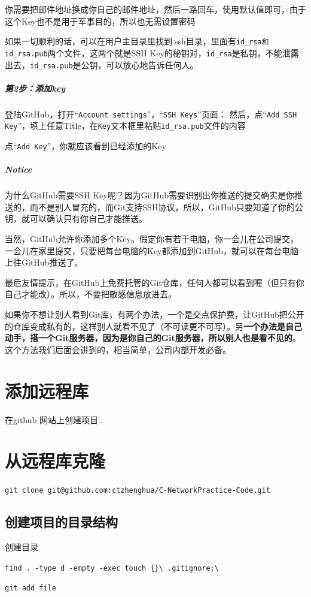 \documentclass[UTF8,a4paper,12pt]{ctexbook}
\begin{document}
		  你需要把邮件地址换成你自己的邮件地址，然后一路回车，使用默认值即可，由于这个Key也不是用于军事目的，所以也无需设置密码
		  
		  如果一切顺利的话，可以在用户主目录里找到.ssh目录，里面有\verb|id_rsa和id_rsa.pub|两个文件，这两个就是SSH Key的秘钥对，\verb|id_rsa|是私钥，不能泄露出去，\verb|id_rsa.pub|是公钥，可以放心地告诉任何人。
		  
		  \subparagraph{第2步：添加key}登陆GitHub，打开“\verb|Account settings|”，“\verb|SSH Keys|”页面：
		  然后，点“\verb|Add SSH Key|”，填上任意Title，在\verb|Key|文本框里粘贴\verb|id_rsa.pub|文件的内容
		  
		  点“\verb|Add Key|”，你就应该看到已经添加的Key
		  
		  \subparagraph{Notice}
			  为什么GitHub需要SSH Key呢？因为GitHub需要识别出你推送的提交确实是你推送的，而不是别人冒充的，而Git支持SSH协议，所以，GitHub只要知道了你的公钥，就可以确认只有你自己才能推送。
			  
			  当然，GitHub允许你添加多个Key。假定你有若干电脑，你一会儿在公司提交，一会儿在家里提交，只要把每台电脑的Key都添加到GitHub，就可以在每台电脑上往GitHub推送了。
			  
			  最后友情提示，在GitHub上免费托管的Git仓库，任何人都可以看到喔（但只有你自己才能改）。所以，不要把敏感信息放进去。
			  
			  如果你不想让别人看到Git库，有两个办法，一个是交点保护费，让GitHub把公开的仓库变成私有的，这样别人就看不见了（不可读更不可写）。另\textbf{一个办法是自己动手，搭一个Git服务器，因为是你自己的Git服务器，所以别人也是看不见的}。这个方法我们后面会讲到的，相当简单，公司内部开发必备。
	  \section{添加远程库}
		  在github 网站上创建项目..
	  \section{从远程库克隆}
		  \verb|git clone git@github.com:ctzhenghua/C-NetworkPractice-Code.git|
		  
		  
		  \subsection{创建项目的目录结构}
			   创建目录 
			  
			   \verb|find . -type d -empty -exec touch {}\ .gitignore;\|
			  
			   \verb|git add file|
			  
\end{document}
